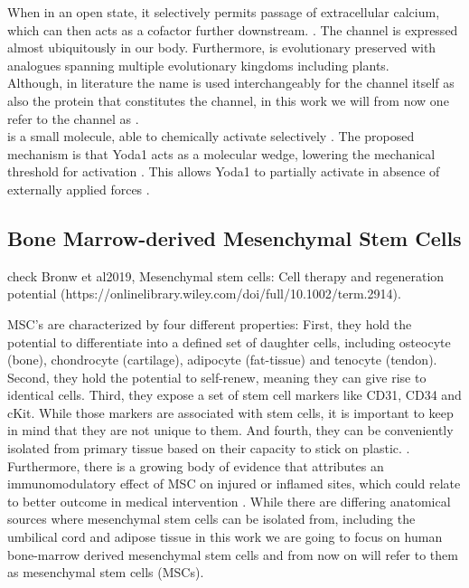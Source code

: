  When in an open state, it selectively permits passage of extracellular calcium, which can then acts as a cofactor further downstream. \cite{Coste2010}. The channel is expressed almost ubiquitously in our body. Furthermore, \Piezo{} is evolutionary preserved with analogues spanning multiple evolutionary kingdoms including plants. \cite{Coste2010}\\
Although, in literature the name \Piezo{} is used interchangeably for the channel itself as also the protein that constitutes the channel, in this work we will from now one refer to the channel as \Piezo{}.\\
\Yoda{} is a small molecule, able to chemically activate \Piezo{} selectively \cite{Syeda2015}. The proposed mechanism is that Yoda1 acts as a molecular wedge, lowering the mechanical threshold for activation \cite{Botello-Smith2019}. This allows Yoda1 to partially activate \Piezo{} in absence of externally applied forces \cite{Lacroix2018}.

\subsection{Bone Marrow-derived Mesenchymal Stem Cells}

check Bronw et al2019, Mesenchymal stem cells: Cell therapy and regeneration potential (https://onlinelibrary.wiley.com/doi/full/10.1002/term.2914). 

MSC's are characterized by four different properties: First, they hold the potential to differentiate into a defined set of daughter cells, including osteocyte (bone), chondrocyte (cartilage), adipocyte (fat-tissue) and tenocyte (tendon).\cite{Ng2008} Second, they hold the potential to self-renew, meaning they can give rise to identical cells. Third, they expose a set of stem cell markers like CD31, CD34 and cKit. While those markers are associated with stem cells, it is important to keep in mind that they are not unique to them. \cite{Battula2009} And fourth, they can be conveniently isolated from primary tissue based on their capacity to stick on plastic. \cite{Buhring2007}. Furthermore, there is a growing body of evidence that attributes an immunomodulatory effect of MSC on injured or inflamed sites, which could relate to better outcome in medical intervention \cite{Hass2011, Caplan2011}.
While there are differing anatomical sources where mesenchymal stem cells can be isolated from, including the umbilical cord and adipose tissue \cite{Barlow2008, Hass2011} in this work we are going to focus on human bone-marrow derived mesenchymal stem cells and from now on will refer to them as mesenchymal stem cells (MSCs).

